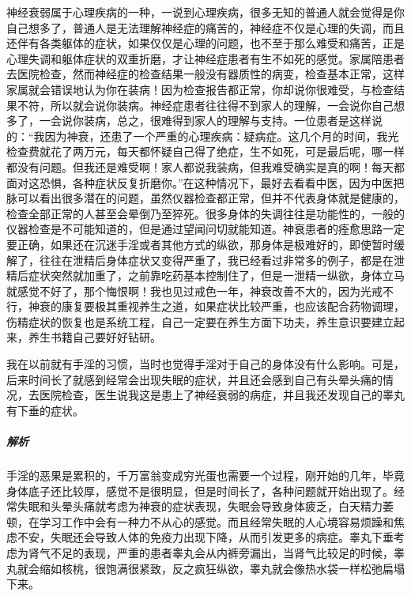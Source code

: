 神经衰弱属于心理疾病的一种，一说到心理疾病，很多无知的普通人就会觉得是你自己想多了，普通人是无法理解神经症的痛苦的，神经症不仅是心理的失调，而且还伴有各类躯体的症状，如果仅仅是心理的问题，也不至于那么难受和痛苦，正是心理失调和躯体症状的双重折磨，才让神经症患者有生不如死的感觉。家属陪患者去医院检查，然而神经症的检查结果一般没有器质性的病变，检查基本正常，这样家属就会错误地认为你在装病！因为检查报告都正常，你却说你很难受，与检查结果不符，所以就会说你装病。神经症患者往往得不到家人的理解，一会说你自己想多了，一会说你装病，总之，很难得到家人的理解与支持。一位患者是这样说的：“我因为神衰，还患了一个严重的心理疾病：疑病症。这几个月的时间，我光检查费就花了两万元，每天都怀疑自己得了绝症，生不如死，可是最后呢，哪一样都没有问题。但我还是难受啊！家人都说我装病，但我难受确实是真的啊！每天都面对这恐惧，各种症状反复折磨你。”在这种情况下，最好去看看中医，因为中医把脉可以看出很多潜在的问题，虽然仪器检查都正常，但并不代表身体就是健康的，检查全部正常的人甚至会晕倒乃至猝死。很多身体的失调往往是功能性的，一般的仪器检查是不可能知道的，但是通过望闻问切就能知道。神衰患者的痊愈思路一定要正确，如果还在沉迷手淫或者其他方式的纵欲，那身体是极难好的，即使暂时缓解了，往往在泄精后身体症状又变得严重了，我已经看过非常多的例子，都是在泄精后症状突然就加重了，之前靠吃药基本控制住了，但是一泄精一纵欲，身体立马就感觉不好了，那个悔恨啊！我也见过戒色一年，神衰改善不大的，因为光戒不行，神衰的康复要极其重视养生之道，如果症状比较严重，也应该配合药物调理，伤精症状的恢复也是系统工程，自己一定要在养生方面下功夫，养生意识要建立起来，养生书籍自己要好好钻研。

\begin{case}[神经衰弱]
    我在以前就有手淫的习惯，当时也觉得手淫对于自己的身体没有什么影响。可是，后来时间长了就感到经常会出现失眠的症状，并且还会感到自己有头晕头痛的情况，去医院检查，医生说我这是患上了神经衰弱的病症，并且我还发现自己的睾丸有下垂的症状。
    \subparagraph{解析} 手淫的恶果是累积的，千万富翁变成穷光蛋也需要一个过程，刚开始的几年，毕竟身体底子还比较厚，感觉不是很明显，但是时间长了，各种问题就开始出现了。经常失眠和头晕头痛就考虑为神衰的症状表现，失眠会导致身体疲乏，白天精力萎顿，在学习工作中会有一种力不从心的感觉。而且经常失眠的人心境容易烦躁和焦虑不安，失眠还会导致人体的免疫力出现下降，从而引发更多的病症。睾丸下垂考虑为肾气不足的表现，严重的患者睾丸会从内裤旁漏出，当肾气比较足的时候，睾丸就会缩如核桃，很饱满很紧致，反之疯狂纵欲，睾丸就会像热水袋一样松弛扁塌下来。
\end{case}


